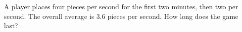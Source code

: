 A player places four pieces per second for the first two minutes, then two per second. The overall average is 3.6 pieces per second. How long does the game last?
